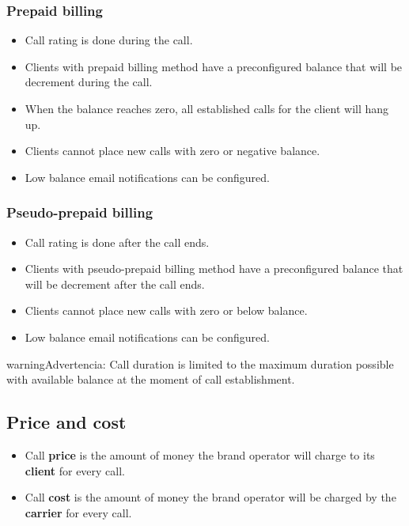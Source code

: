 \documentclass[letterpaper,10pt,spanish]{sphinxmanual}
\begin{document}
\subsubsection{Prepaid billing}
\label{administration_portal/brand/billing/index:prepaid-billing}\begin{itemize}
\item {} 
Call rating is done during the call.

\item {} 
Clients with prepaid billing method have a preconfigured balance that will be decrement during the call.

\item {} 
When the balance reaches zero, all established calls for the client will hang up.

\item {} 
Clients cannot place new calls with zero or negative balance.

\item {} 
Low balance email notifications can be configured.

\end{itemize}


\subsubsection{Pseudo-prepaid billing}
\label{administration_portal/brand/billing/index:pseudo-prepaid-billing}\begin{itemize}
\item {} 
Call rating is done after the call ends.

\item {} 
Clients with pseudo-prepaid billing method have a preconfigured balance that will be decrement after the call ends.

\item {} 
Clients cannot place new calls with zero or below balance.

\item {} 
Low balance email notifications can be configured.

\end{itemize}

\begin{notice}{warning}{Advertencia:}
Call duration is limited to the maximum duration possible with available balance at the moment of call establishment.
\end{notice}


\subsection{Price and cost}
\label{administration_portal/brand/billing/index:price-and-cost}\begin{itemize}
\item {} 
Call \textbf{price} is the amount of money the brand operator will charge to its \textbf{client} for every call.

\item {} 
Call \textbf{cost} is the amount of money the brand operator will be charged by the \textbf{carrier} for every call.

\end{itemize}
\end{document}
